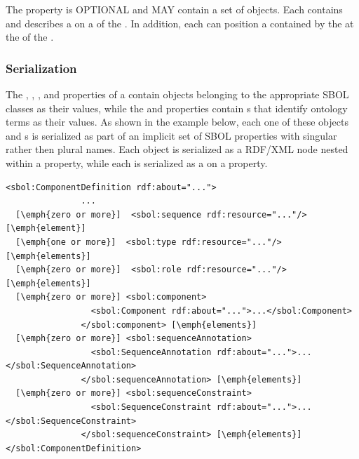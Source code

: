 The  property is OPTIONAL and MAY contain a set of  objects. Each  contains and describes a  on a  of the . In addition, each  can  position a  contained by the  at the  of the .

\subsubsection*{Serialization}
The , ,  , and  properties of a  contain objects belonging to the appropriate SBOL classes as their values, while the  and  properties contain s that identify ontology terms as their values. As shown in the example below, each one of these objects and s is serialized as part of an implicit set of SBOL properties with singular rather then plural names. Each object is serialized as a RDF/XML node nested within a property, while each  is serialized as a  on a property.

\begin{lstlisting}
<sbol:ComponentDefinition rdf:about="...">
               ...
  [\emph{zero or more}]  <sbol:sequence rdf:resource="..."/> [\emph{element}]
  [\emph{one or more}]  <sbol:type rdf:resource="..."/> [\emph{elements}]
  [\emph{zero or more}]  <sbol:role rdf:resource="..."/> [\emph{elements}]    
  [\emph{zero or more}] <sbol:component>
                 <sbol:Component rdf:about="...">...</sbol:Component>
               </sbol:component> [\emph{elements}]
  [\emph{zero or more}] <sbol:sequenceAnnotation>
                 <sbol:SequenceAnnotation rdf:about="...">...</sbol:SequenceAnnotation>
               </sbol:sequenceAnnotation> [\emph{elements}]        
  [\emph{zero or more}] <sbol:sequenceConstraint>
                 <sbol:SequenceConstraint rdf:about="...">...</sbol:SequenceConstraint>
               </sbol:sequenceConstraint> [\emph{elements}]        
</sbol:ComponentDefinition>
\end{lstlisting}

